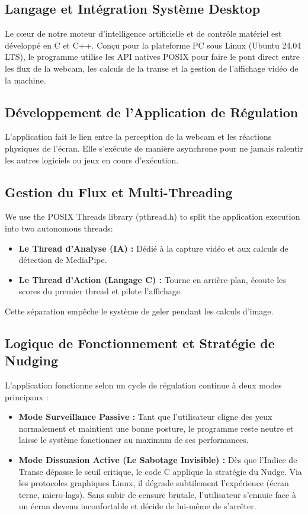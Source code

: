\documentclass[a4paper, 12pt, twoside]{article}
\begin{document}
\subsection{Langage et Intégration Système Desktop}
Le cœur de notre moteur d'intelligence artificielle et de contrôle matériel est développé en C et C++. Conçu pour la plateforme PC sous Linux (Ubuntu 24.04 LTS), le programme utilise les API natives POSIX pour faire le pont direct entre les flux de la webcam, les calculs de la transe et la gestion de l'affichage vidéo de la machine.

\subsection{Développement de l'Application de Régulation}
L'application fait le lien entre la perception de la webcam et les réactions physiques de l'écran. Elle s'exécute de manière asynchrone pour ne jamais ralentir les autres logiciels ou jeux en cours d'exécution.

\subsection{Gestion du Flux et Multi-Threading}
We use the POSIX Threads library (pthread.h) to split the application execution into two autonomous threads:
\begin{itemize}
    \item \textbf{Le Thread d'Analyse (IA) :} Dédié à la capture vidéo et aux calculs de détection de MediaPipe.
    \item \textbf{Le Thread d'Action (Langage C) :} Tourne en arrière-plan, écoute les scores du premier thread et pilote l'affichage.
\end{itemize}
Cette séparation empêche le système de geler pendant les calculs d'image.

\subsection{Logique de Fonctionnement et Stratégie de Nudging}
L'application fonctionne selon un cycle de régulation continue à deux modes principaux :
\begin{itemize}
    \item \textbf{Mode Surveillance Passive :} Tant que l'utilisateur cligne des yeux normalement et maintient une bonne posture, le programme reste neutre et laisse le système fonctionner au maximum de ses performances.
    \item \textbf{Mode Dissuasion Active (Le Sabotage Invisible) :} Dès que l'Indice de Transe dépasse le seuil critique, le code C applique la stratégie du Nudge. Via les protocoles graphiques Linux, il dégrade subtilement l'expérience (écran terne, micro-lags). Sans subir de censure brutale, l'utilisateur s'ennuie face à un écran devenu inconfortable et décide de lui-même de s'arrêter.
\end{itemize}
\end{document}
